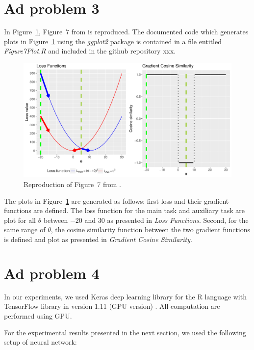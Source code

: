 \documentclass{article} %
\begin{document}
\section{Ad problem 3}

In Figure~\ref{Fig:LossFunc}, Figure~7 from \citep{du2018adapting} is reproduced. The documented code which generates plots in Figure~\ref{Fig:LossFunc} using the \textit{ggplot2} package is contained in a file entitled \textit{Figure7Plot.R} and included in the github repository xxx.  

\begin{figure}[h!t]
	\centering 
	\includegraphics[width=1.0\linewidth]{Figure7.pdf}
	\caption{Reproduction of Figure~7 from \citep{du2018adapting}.}
	\label{Fig:LossFunc} 
\end{figure}

The plots in Figure~\ref{Fig:LossFunc} are generated as follows: first loss and their gradient functions are defined. The loss function for the main task and auxiliary task are plot for all $ \theta $ between $ -20 $ and $ 30 $ as presented in \textit{Loss Functions}. Second,  for the same range of $ \theta $, the cosine similarity function between the two gradient functions is defined and plot as presented in \textit{Gradient Cosine Similarity}.  

\section{Ad problem 4}

In our experiments, we used Keras deep learning library for the R language \cite{Keras}  with TensorFlow library in version 1.11 (GPU version) \cite{TensorFlow}. All computation are performed using GPU. 

For the experimental results presented in the next section, we used the following setup of neural network:
\end{document}
